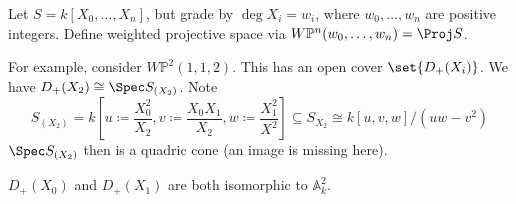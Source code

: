 Let $S = k[X_0, \ldots, X_n]$, but grade by $\deg X_i = w_i$, where
$w_0, \ldots, w_n$ are positive integers. Define weighted projective
space via $W\mathbb{P}^n(w_0, \ldots, w_n) = \Proj S$.

For example, consider $W\mathbb{P}^2(1, 1, 2)$. This has an open cover
$\set{D_+(X_i)}$. We have $D_+(X_2) \cong \Spec S_{(X_2)}$.
Note \[ S_{(X_2)} = k[u\coloneqq\frac{X_0^2}{X_2}, v\coloneqq\frac{X_0X_1}{X_2}, w\coloneqq\frac{X_1^2}{X^2}] \subseteq S_{X_2} \cong k[u, v, w]/(uw-v^2)\]
$\Spec S_{(X_2)}$ then is a quadric cone (an image is missing here).

$D_+(X_0)$ and $D_+(X_1)$ are both isomorphic to $\mathbb{A}_k^2$.
